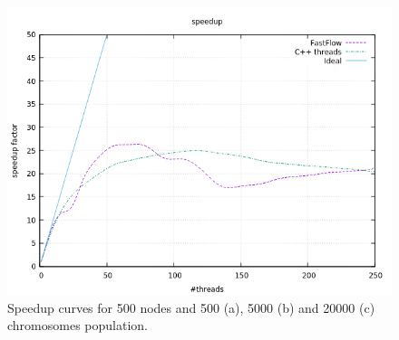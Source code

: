 \documentclass[a4paper,10pt]{article}
\begin{document}
\begin{figure}[H]
\begin{minipage}[t]{0.32\linewidth}
				\subcaption{}
			\end{minipage}
				\begin{minipage}[t]{0.32\linewidth}
				\includegraphics[width=\linewidth]{BenchMarkTSP/speedup/500/SU50020000_zoom.png}
				\subcaption{}
			\end{minipage}
				\caption{Speedup curves for 500 nodes and 500 (a), 5000 (b) and 20000 (c) chromosomes population.}
				\label{500}
			\end{figure}
\end{document}
